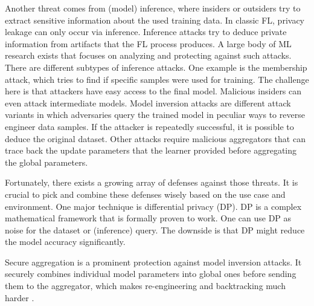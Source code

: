 Another threat comes from (model) inference, where insiders or outsiders try to extract sensitive information about the used training data.
In classic FL, privacy leakage can only occur via inference.
Inference attacks try to deduce private information from artifacts that the FL process produces.
A large body of ML research exists that focuses on analyzing and protecting against such attacks.
There are different subtypes of inference attacks.
One example is the membership attack, which tries to find if specific samples were used for training.
The challenge here is that attackers have easy access to the final model.
Malicious insiders can even attack intermediate models.
Model inversion attacks are different attack variants in which adversaries query the trained model in peculiar ways to reverse engineer data samples. 
If the attacker is repeatedly successful, it is possible to deduce the original dataset.
Other attacks require malicious aggregators that can trace back the update parameters that the learner provided before aggregating the global parameters. \cite{book:fl}

Fortunately, there exists a growing array of defenses against those threats.
It is crucial to pick and combine these defenses wisely based on the use case and environment.
One major technique is differential privacy (DP).
DP is a complex mathematical framework that is formally proven to work.
One can use DP as noise for the dataset or (inference) query.
The downside is that DP might reduce the model accuracy significantly. \cite{book:fl}

Secure aggregation is a prominent protection against model inversion attacks.
It securely combines individual model parameters into global ones before sending them to the aggregator, which makes re-engineering and backtracking much harder \cite{paper:cluster-based-secure-aggregation-FL}. 